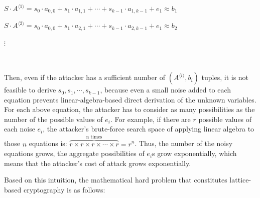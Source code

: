 $S \cdot A^{\langle 1 \rangle} = s_0\cdot a_{0,0} + s_1\cdot a_{1,1} + \cdots + s_{k-1}\cdot a_{1,k-1} + e_1 \approx b_1$

$S \cdot A^{\langle 2 \rangle} = s_0\cdot a_{0,0} + s_1\cdot a_{2,1} + \cdots + s_{k-1}\cdot a_{2,k-1} + e_1 \approx b_2$

\text{ } $\vdots$


$ $

Then, even if the attacker has a sufficient number of $(A^{\langle i \rangle}, b_i)$ tuples, it is not feasible to derive $s_0, s_1, \cdots, s_{k-1}$, because even a small noise added to each equation prevents linear-algebra-based direct derivation of the unknown variables. For each above equation, the attacker has to consider as many possibilities as the number of the possible values of $e_i$. For example, if there are $r$ possible values of each noise $e_i$, the attacker's brute-force search space of applying linear algebra to those $n$ equations is: $\overbrace{r \times r \times r \times \cdots \times r}^{\text{n times}} = r^n$. Thus, the number of the noisy equations grows, the aggregate possibilities of $e_i$s grow exponentially, which means that the attacker's cost of attack grows exponentially. 

Based on this intuition, the mathematical hard problem that constitutes lattice-based cryptography is as follows:

$ $

